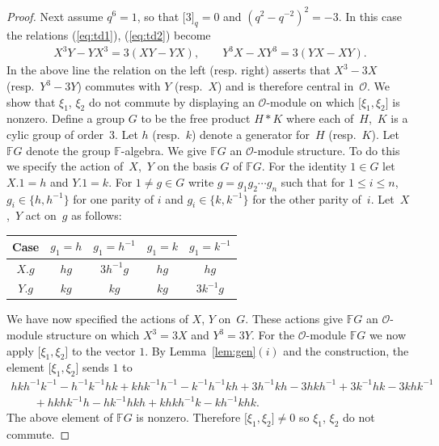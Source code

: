\documentclass[pdftex]{sigma}
\numberwithin{equation}{section}
\begin{document}
\begin{proof}
  Next assume
$q^6=1$, so that
$\lbrack 3\rbrack_q=0$ and
$(q^2-q^{-2})^2=-3$.
In this case the relations
(\ref{eq:td1}),
(\ref{eq:td2}) become
\begin{gather*}
X^3Y-YX^3=3(XY-YX),
\qquad
Y^3X-XY^3=3(YX-XY).
\end{gather*}
In the above line the relation on the left (resp. right)
asserts that $X^3-3X$ (resp.~$Y^3-3Y$)
commutes with $Y$ (resp.~$X$) and is therefore
central in~$\mathcal O$.
We show that $\xi_1$, $\xi_2$ do not commute by
displaying
an $\mathcal O$-module on which
$\lbrack \xi_1, \xi_2\rbrack$ is nonzero.
Def\/ine a group $G$ to be the free product
$H * K$ where each of~$H$,~$K$ is a cylic
group of order~3.
Let $h$ (resp.~$k$) denote a generator for~$H$ (resp.~$K$).
Let $\mathbb F G$ denote the group $\mathbb F$-algebra.
We give $\mathbb F G$ an $\mathcal O$-module structure.
To do this we specify the action of~$X$,~$Y$ on
the basis $G$ of $\mathbb F G$. For the identity $ 1\in G$
let $X.1=h$ and $Y.1=k$.
For $1 \not=g \in G$ write
$g=g_1g_2\cdots g_n$ such that
 for $1 \leq i \leq n$,
 $ g_i \in \lbrace h, h^{-1}\rbrace $
 for one parity of $i$ and
$g_i \in \lbrace k,k^{-1} \rbrace$ for the other parity of~$i$.
Let~$X$,~$Y$ act on~$g$ as follows:
\begin{center}
\begin{tabular}{c|c c c c}
Case &  $g_1=h$ & $g_1=h^{-1}$  & $g_1=k$ & $g_1=k^{-1}$ \\
\hline \hline
$X.g$ & $hg$ & $ 3h^{-1}g$ & $hg$ & $hg$ \\
$Y.g$ & $kg$ & $ kg$ & $kg$ & $3k^{-1}g$
    \end{tabular}
        \end{center}
We have now specif\/ied the actions of $X$, $Y$
on~$G$.
These actions
give $\mathbb F G$ an
 $\mathcal O$-module
structure on
which $X^3=3X$ and $Y^3=3Y$.
For the $\mathcal O$-module $\mathbb F G$ we now
apply
$\lbrack \xi_1, \xi_2\rbrack$ to the vector $1$.
By
Lemma~\ref{lem:gen}$(i)$ and the construction,
the element
$\lbrack \xi_1, \xi_2\rbrack$ sends  $1$
to
\begin{gather*}
 hkh^{-1}k^{-1}-h^{-1}k^{-1}hk+
khk^{-1}h^{-1}-k^{-1}h^{-1}kh
+
  3 h^{-1}kh-3hkh^{-1}
+ 3 k^{-1}hk-3khk^{-1}
\\
\qquad {} +
hkhk^{-1}h-hk^{-1}hkh+
khkh^{-1}k-kh^{-1}khk.
\end{gather*}
The above element of $\mathbb F G$
is nonzero. Therefore
$\lbrack \xi_1, \xi_2\rbrack \not=0$
so
$\xi_1$, $\xi_2$ do not commute.
\end{proof}
\end{document}
